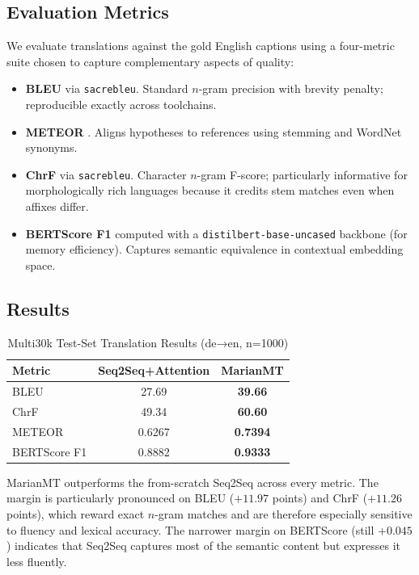 \subsection{Evaluation Metrics}

We evaluate translations against the gold English captions using a
four-metric suite chosen to capture complementary aspects of quality:

\begin{itemize}
  \item \textbf{BLEU} \cite{papineni2002bleu} via \texttt{sacrebleu}.
        Standard $n$-gram precision with brevity penalty; reproducible
        exactly across toolchains.
  \item \textbf{METEOR} \cite{banerjee2005meteor}. Aligns hypotheses to
        references using stemming and WordNet synonyms.
  \item \textbf{ChrF} \cite{popovic2015chrf} via \texttt{sacrebleu}.
        Character $n$-gram F-score; particularly informative for
        morphologically rich languages because it credits stem matches
        even when affixes differ.
  \item \textbf{BERTScore F1} \cite{zhang2020bertscore} computed with a
        \texttt{distilbert-base-uncased} backbone (for memory
        efficiency). Captures semantic equivalence in contextual
        embedding space.
\end{itemize}

\subsection{Results}

\begin{table}[h]
\centering
\caption{Multi30k Test-Set Translation Results (de→en, n=1000)}
\label{tab:q4_results}
\begin{tabular}{lcc}
\toprule
Metric            & Seq2Seq+Attention & MarianMT \\
\midrule
BLEU              & 27.69 & \textbf{39.66} \\
ChrF              & 49.34 & \textbf{60.60} \\
METEOR            & 0.6267 & \textbf{0.7394} \\
BERTScore F1      & 0.8882 & \textbf{0.9333} \\
\bottomrule
\end{tabular}
\end{table}

MarianMT outperforms the from-scratch Seq2Seq across every metric. The
margin is particularly pronounced on BLEU ($+11.97$ points) and ChrF
($+11.26$ points), which reward exact $n$-gram matches and are
therefore especially sensitive to fluency and lexical accuracy. The
narrower margin on BERTScore (still $+0.045$) indicates that Seq2Seq
captures most of the semantic content but expresses it less fluently.

